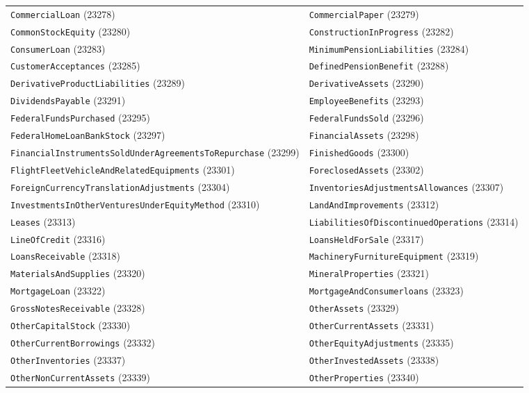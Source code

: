 \documentclass[11pt,a4paper]{report}
\begin{document}
\begin{subappendices}
{\begin{longtable}{@{}p{}p{}@{}}
\texttt{CommercialLoan} (23278) & \texttt{CommercialPaper} (23279) \\
\texttt{CommonStockEquity} (23280) & \texttt{ConstructionInProgress} (23282) \\
\texttt{ConsumerLoan} (23283) & \texttt{MinimumPensionLiabilities} (23284) \\
\texttt{CustomerAcceptances} (23285) & \texttt{DefinedPensionBenefit} (23288) \\
\texttt{DerivativeProductLiabilities} (23289) & \texttt{DerivativeAssets} (23290) \\
\texttt{DividendsPayable} (23291) & \texttt{EmployeeBenefits} (23293) \\
\texttt{FederalFundsPurchased} (23295) & \texttt{FederalFundsSold} (23296) \\
\texttt{FederalHomeLoanBankStock} (23297) & \texttt{FinancialAssets} (23298) \\
\texttt{FinancialInstrumentsSoldUnderAgreementsToRepurchase} (23299) & \texttt{FinishedGoods} (23300) \\
\texttt{FlightFleetVehicleAndRelatedEquipments} (23301) & \texttt{ForeclosedAssets} (23302) \\
\texttt{ForeignCurrencyTranslationAdjustments} (23304) & \texttt{InventoriesAdjustmentsAllowances} (23307) \\
\texttt{InvestmentsInOtherVenturesUnderEquityMethod} (23310) & \texttt{LandAndImprovements} (23312) \\
\texttt{Leases} (23313) & \texttt{LiabilitiesOfDiscontinuedOperations} (23314) \\
\texttt{LineOfCredit} (23316) & \texttt{LoansHeldForSale} (23317) \\
\texttt{LoansReceivable} (23318) & \texttt{MachineryFurnitureEquipment} (23319) \\
\texttt{MaterialsAndSupplies} (23320) & \texttt{MineralProperties} (23321) \\
\texttt{MortgageLoan} (23322) & \texttt{MortgageAndConsumerloans} (23323) \\
\texttt{GrossNotesReceivable} (23328) & \texttt{OtherAssets} (23329) \\
\texttt{OtherCapitalStock} (23330) & \texttt{OtherCurrentAssets} (23331) \\
\texttt{OtherCurrentBorrowings} (23332) & \texttt{OtherEquityAdjustments} (23335) \\
\texttt{OtherInventories} (23337) & \texttt{OtherInvestedAssets} (23338) \\
\texttt{OtherNonCurrentAssets} (23339) & \texttt{OtherProperties} (23340) \\

\end{longtable}}
\end{subappendices}
\end{document}
